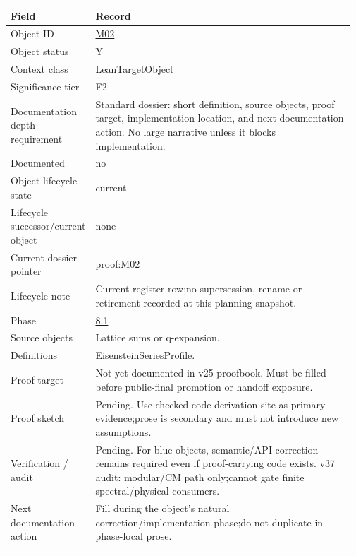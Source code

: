 \begin{longtable}{L{0.16\linewidth} L{0.81\linewidth}}
\hline
\textbf{Field} & \textbf{Record}\\
\hline
Object ID & \hyperlink{object-row-M02}{M02}\\
\hline\addlinespace[0.20em]
Object status & Y\\
\hline\addlinespace[0.20em]
Context class & LeanTargetObject\\
\hline\addlinespace[0.20em]
Significance tier & F2\\
\hline\addlinespace[0.20em]
Documentation depth requirement & Standard dossier: short definition, source objects, proof target, implementation location, and next documentation action. No large narrative unless it blocks implementation.\\
\hline\addlinespace[0.20em]
Documented & no\\
\hline\addlinespace[0.20em]
Object lifecycle state & current\\
\hline\addlinespace[0.20em]
Lifecycle successor/\allowbreak{}current object & none\\
\hline\addlinespace[0.20em]
Current dossier pointer & proof:M02\\
\hline\addlinespace[0.20em]
Lifecycle note & Current register row;\newline no supersession, rename or retirement recorded at this planning snapshot.\\
\hline\addlinespace[0.20em]
Phase & \hyperlink{phase-row-8-1}{8.1}\\
\hline\addlinespace[0.20em]
Source objects & Lattice sums or q-expansion.\\
\hline\addlinespace[0.20em]
Definitions & EisensteinSeriesProfile.\\
\hline\addlinespace[0.20em]
Proof target & Not yet documented in v25 proofbook. Must be filled before public-final promotion or handoff exposure.\\
\hline\addlinespace[0.20em]
Proof sketch & Pending. Use checked code derivation site as primary evidence;\newline prose is secondary and must not introduce new assumptions.\\
\hline\addlinespace[0.20em]
Verification /\allowbreak{} audit & Pending. For blue objects, semantic/\allowbreak{}API correction remains required even if proof-carrying code exists. v37 audit: modular/\allowbreak{}CM path only;\newline cannot gate finite spectral/\allowbreak{}physical consumers.\\
\hline\addlinespace[0.20em]
Next documentation action & Fill during the object's natural correction/\allowbreak{}implementation phase;\newline do not duplicate in phase-local prose.\\
\hline\addlinespace[0.20em]
\end{longtable}
